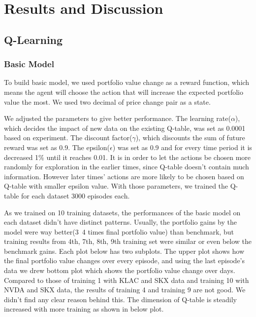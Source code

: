 \chapter{Results and Discussion}
\label{Ch:Result and Discussion}
\section{Q-Learning}

\subsection{Basic Model}
To build basic model, we used portfolio value change as a reward function, which means the agent will choose the action that will increase the expected portfolio value the most. We used two decimal of price change pair as a state.

We adjusted the parameters to give better performance. The learning rate($\alpha$), which decides the impact of new data on the existing Q-table, was set as 0.0001 based on experiment. The discount factor($\gamma$), which discounts the sum of future reward was set as 0.9. The epsilon($\epsilon$) was set as 0.9 and for every time period it is decreased 1\% until it reaches 0.01. It is in order to let the actions be chosen more randomly for exploration in the earlier times, since Q-table doesn’t contain much information. However later times’ actions are more likely to be chosen based on Q-table with smaller epsilon value. With those parameters, we trained the Q-table for each dataset 3000 episodes each.

As we trained on 10 training datasets, the performances of the basic model on each dataset didn’t have distinct patterns. Usually, the portfolio gains by the model were way better(3~4 times final portfolio value) than benchmark, but training results from 4th, 7th, 8th, 9th training set were similar or even below the benchmark gains. Each plot below has two subplots. The upper plot shows how the final portfolio value changes over every episode, and using the last episode’s data we drew bottom plot which shows the portfolio value change over days. Compared to those of training 1 with KLAC and SKX data and training 10 with NVDA and SKX data, the results of training 4 and training 9 are not good. We didn’t find any clear reason behind this. The dimension of Q-table is steadily increased with more training as shown in below plot.

